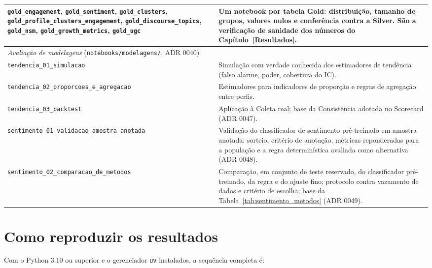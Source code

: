 \begin{table}[htb]
\begin{tabular}{p{5.6cm}p{8.6cm}}
\texttt{gold\_\allowbreak{}engagement}, \texttt{gold\_\allowbreak{}sentiment}, \texttt{gold\_\allowbreak{}clusters}, \texttt{gold\_\allowbreak{}profile\_\allowbreak{}clusters\_\allowbreak{}engagement}, \texttt{gold\_\allowbreak{}discourse\_\allowbreak{}topics}, \texttt{gold\_\allowbreak{}nsm}, \texttt{gold\_\allowbreak{}growth\_\allowbreak{}metrics}, \texttt{gold\_\allowbreak{}ugc} & Um notebook por tabela Gold: distribuição, tamanho de grupos, valores nulos e conferência contra a Silver. São a verificação de sanidade dos números do Capítulo~\ref{Resultados}. \\
\midrule
\multicolumn{2}{l}{\emph{Avaliação de modelagens} (\texttt{notebooks/modelagens/}, ADR 0040)} \\
\texttt{tendencia\_\allowbreak{}01\_\allowbreak{}simulacao} & Simulação com verdade conhecida dos estimadores de tendência (falso alarme, poder, cobertura do IC). \\
\texttt{tendencia\_\allowbreak{}02\_\allowbreak{}proporcoes\_\allowbreak{}e\_\allowbreak{}agregacao} & Estimadores para indicadores de proporção e regras de agregação entre perfis. \\
\texttt{tendencia\_\allowbreak{}03\_\allowbreak{}backtest} & Aplicação à Coleta real; base da Consistência adotada no Scorecard (ADR 0047). \\
\texttt{sentimento\_\allowbreak{}01\_\allowbreak{}validacao\_\allowbreak{}amostra\_\allowbreak{}anotada} & Validação do classificador de sentimento pré-treinado em amostra anotada: sorteio, critério de anotação, métricas reponderadas para a população e a regra determinística avaliada como alternativa (ADR 0048). \\
\texttt{sentimento\_\allowbreak{}02\_\allowbreak{}comparacao\_\allowbreak{}de\_\allowbreak{}metodos} & Comparação, em conjunto de teste reservado, do classificador pré-treinado, da regra e do ajuste fino; protocolo contra vazamento de dados e critério de escolha; base da Tabela~\ref{tab:sentimento_metodos} (ADR 0049). \\
\bottomrule
\end{tabular}
\end{table}

\section*{Como reproduzir os resultados}

Com o Python 3.10 ou superior e o gerenciador \texttt{uv} instalados, a sequência completa é:

